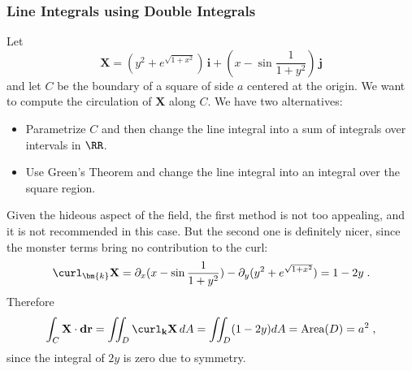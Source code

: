 \begin{frame}
  \frametitle{Line Integrals using Double Integrals}

  Let
%
$$\textbf{X} = (y^2+e^{\sqrt{1+x^2}}) \, \textbf{i} + (x-\sin{\frac{1}{1+y^2}})\, \textbf{j}$$
%
and let $C$ be the boundary of a square of side $a$ centered at the origin. We want to compute the circulation of $\textbf{X}$ along $C$. We have two alternatives:

\begin{itemize}
  \item Parametrize $C$ and then change the line integral into a sum of integrals over intervals in $\RR$.
  \item Use Green's Theorem and change the line integral into an integral over the square region.
\end{itemize}

Given the hideous aspect of the field, the first method is not too appealing, and it is not recommended in this case. But the second one is definitely nicer, since the monster terms bring no contribution to the curl:
%
$$\curl_{\bm{k}} \textbf{X} = \partial_x (x-\sin{\frac{1}{1+y^2}}) - \partial_y (y^2+e^{\sqrt{1+x^2}}) = 1-2y \; .$$
%
Therefore
%
$$\int_C \textbf{X} \cdot \textbf{dr} = \int\!\!\!\int_D \curl_{\textbf{k}} \textbf{X} \, dA = \int\!\!\!\int_D (1-2y) dA = \text{Area}(D) = a^2\; ,$$
%
since the integral of $2y$ is zero due to symmetry.
\end{frame}

